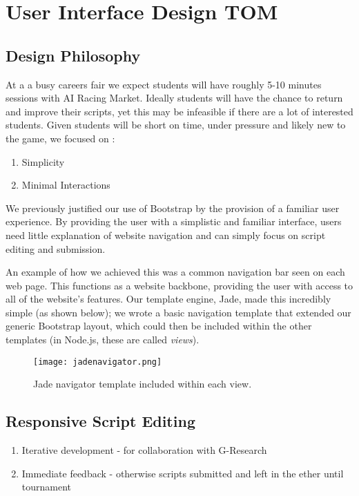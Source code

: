 \section{User Interface Design {\color{red} TOM}}

\subsection{Design Philosophy}

At a a busy careers fair we expect students will have roughly 5-10 minutes sessions with AI Racing Market. Ideally students will have the chance to return and improve their scripts, yet this may be infeasible if there are a lot of interested students. Given students will be short on time, under pressure and likely new to the game, we focused on :
\vspace{-1mm}
\begin{enumerate} \itemsep -2pt 
\item Simplicity
\item Minimal Interactions
\end{enumerate}

We previously justified our use of Bootstrap by the provision of a familiar user experience. By providing the user with a simplistic and familiar interface, users need little explanation of website navigation and can simply focus on script editing and submission. 

An example of how we achieved this was a common navigation bar seen on each web page. This functions as a website backbone, providing the user with access to all of the website's  features. Our template engine, Jade, made this incredibly simple (as shown below); we wrote a basic navigation template that extended our generic Bootstrap layout, which could then be included within the other templates (in Node.js, these are called {\it views}). 

\begin{figure}[H]
\centering
\texttt{[image: jadenavigator.png]}
\caption{Jade navigator template included within each view.}
\end{figure}

\subsection{Responsive Script Editing}

\begin{enumerate}
\item Iterative development - for collaboration with G-Research
\item Immediate feedback - otherwise scripts submitted and left in the ether until tournament
\end{enumerate}

